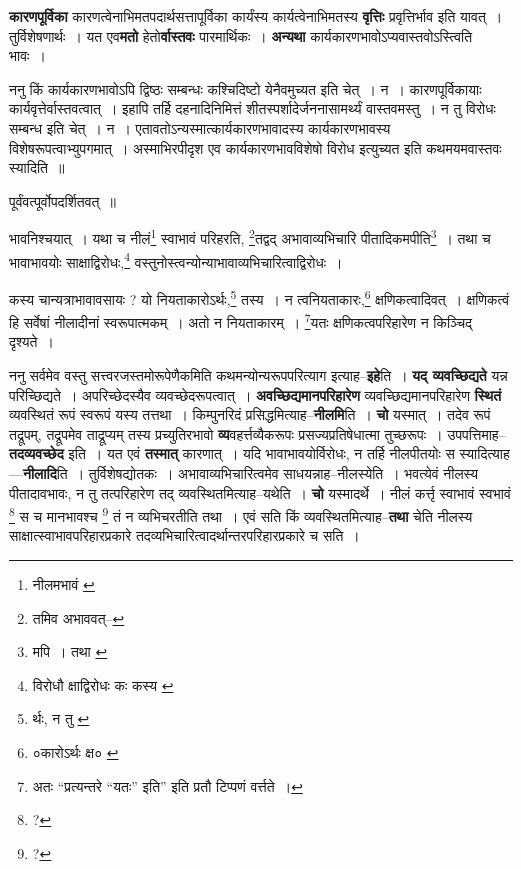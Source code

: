 \documentclass[article,12pt,a4paper]{memoir}
\begin{document}
	  \endgroup
	

	  \pstart \textbf{कारणपूर्विका} कारणत्वेनाभिमतपदार्थसत्तापूर्विका कार्यंस्य कार्यत्वेनाभिमतस्य \textbf{वृत्तिः} प्रवृत्तिर्भाव इति यावत् । तुर्विशेषणार्थः । यत एव\textbf{मतो} हेतो\textbf{र्वास्तवः} पारमार्थिकः । \textbf{अन्यथा} कार्यकारणभावोऽप्यवास्तवोऽस्त्विति भावः ।
	\pend
      

	  \pstart ननु किं कार्यकारणभावोऽपि द्विष्ठः सम्बन्धः कश्चिदिष्टो येनैवमुच्यत इति चेत् । न । कारणपूर्विकायाः कार्यवृत्तेर्वास्तवत्वात् । इहापि तर्हि दहनादिनिमित्तं शीतस्पर्शादेर्जननासामर्थ्यं वास्तवमस्तु । न तु विरोधः सम्बन्ध इति चेत् । न । एतावतोऽन्यस्मात्कार्यकारणभावादस्य कार्यकारणभावस्य विशेषरूपत्वाभ्युपगमात् । अस्माभिरपीदृश एव कार्यकारणभावविशेषो विरोध इत्युच्यत इति कथमयमवास्तवः स्यादिति ॥
	\pend
      

	  \pstart पूर्वंवत्पूर्वोपदर्शितवत् ॥
	\pend
      \leavevmode{}
	  \bigskip
	  \begingroup
	

	  \pstart भावनिश्चयात् । यथा च नीलं\footnote{नीलमभावं \cite{dp-msA} \cite{dp-msB} \cite{dp-msC} \cite{dp-edP} \cite{dp-edH}} स्वाभावं परिहरति, \footnote{तमिव अभाववत्--\cite{dp-msD-n}}तद्वद् अभावाव्यभिचारि पीतादिकमपीति\footnote{मपि । तथा \cite{dp-msA} \cite{dp-msB} \cite{dp-edP} \cite{dp-edH} \cite{dp-edE} \cite{dp-edN}} । तथा च भावाभावयोः साक्षाद्विरोधः,\footnote{विरोधौ \cite{dp-msA} क्षाद्विरोधः कः कस्य \cite{dp-msB}} वस्तुनोस्त्वन्योन्याभावाव्यभिचारित्वाद्विरोधः ।
	\pend
       

	  \pstart कस्य चान्यत्राभावावसायः ? यो नियताकारोऽर्थः,\footnote{र्थः, न तु \cite{dp-edE}} तस्य । न त्वनियताकारः,\footnote{०कारोऽर्थः क्ष० \cite{dp-msA} \cite{dp-msB} \cite{dp-edP} \cite{dp-edH} \cite{dp-edE} \cite{dp-edN}} क्षणिकत्वादिवत् । क्षणिकत्वं हि सर्वेषां नीलादीनां स्वरूपात्मकम् । अतो न नियताकारम् । \footnote{अतः \cite{dp-msD} \cite{dp-edE} “प्रत्यन्तरे “यतः” इति” इति \cite{dp-msD} प्रतौ टिप्पणं वर्त्तते ।}यतः क्षणिकत्वपरिहारेण न किञ्चिद् दृश्यते ।
	\pend
      
	  \endgroup
	

	  \pstart ननु सर्वमेव वस्तु सत्त्वरजस्तमोरूपेणैकमिति कथमन्योन्यरूपपरित्याग इत्याह--\textbf{इहे}ति । \textbf{यद् व्यवच्छिद्यते} यन्न परिच्छिद्यते । अपरिच्छेदस्यैव व्यवच्छेदरूपत्वात् । \textbf{अवच्छिद्यमानपरिहारेण} व्यवच्छिद्यमानपरिहारेण \textbf{स्थितं} व्यवस्थितं रूपं स्वरूपं यस्य तत्तथा । किम्पुनरिदं प्रसिद्धमित्याह--\textbf{नीलमि}ति । \textbf{चो} यस्मात् । तदेव रूपं तद्रूपम्, तद्रूपमेव ताद्रूप्यम् तस्य प्रच्युतिरभावो \textbf{व्य}वहर्त्तव्यैकरूपः प्रसज्यप्रतिषेधात्मा तुच्छरूपः । उपपत्तिमाह--\textbf{तदव्यवच्छेद} इति । यत एवं \textbf{तस्मात्} कारणात् । यदि भावाभावयोर्विरोधः, न तर्हि नीलपीतयोः स स्यादित्याह—\textbf{नीलादि}ति । तुर्विशेषद्योतकः । अभावाव्यभिचारित्वमेव साधयन्नाह--नीलस्येति । भवत्येवं नीलस्य पीतादावभावः, न तु तत्परिहारेण तद् व्यवस्थितमित्याह--यथेति । \textbf{चो} यस्मादर्थे । नीलं कर्त्तृ स्वाभावं स्वभावं \footnote{?} स च मानभावश्च \footnote{?} तं न व्यभिचरतीति तथा । एवं सति किं व्यवस्थितमित्याह--\textbf{तथा} चेति नीलस्य साक्षात्स्वाभावपरिहारप्रकारे तदव्यभिचारित्वादर्थान्तरपरिहारप्रकारे च सति ।
	\pend
      
\end{document}
